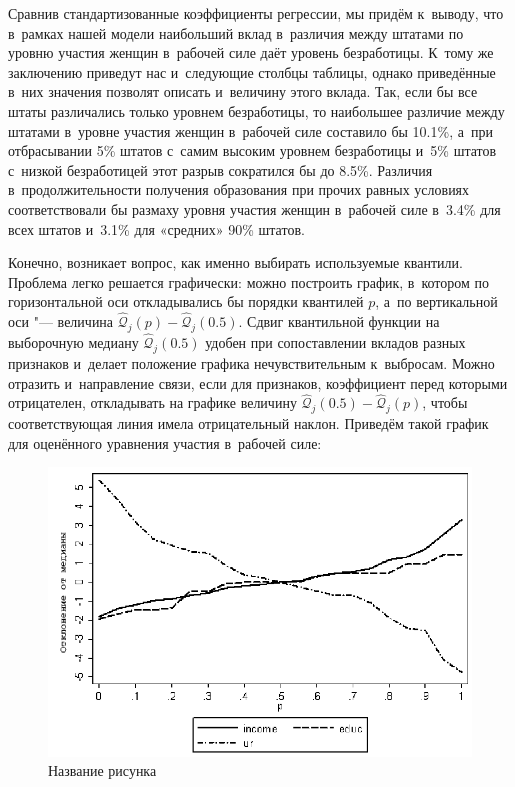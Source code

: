 \documentclass[11pt]{article}
\begin{document}
Сравнив стандартизованные коэффициенты регрессии, мы придём к~выводу, что в~рамках нашей модели наибольший вклад в~различия между штатами по уровню участия женщин в~рабочей силе даёт уровень безработицы. К~тому же заключению приведут нас и~следующие столбцы таблицы, однако приведённые в~них значения позволят описать и~величину этого вклада. Так, если бы все штаты различались только уровнем безработицы, то наибольшее различие между штатами в~уровне участия женщин в~рабочей силе составило бы 10.1\%, а~при отбрасывании 5\% штатов с~самим высоким уровнем безработицы и~5\% штатов с~низкой безработицей этот разрыв сократился бы до 8.5\%. Различия в~продолжительности получения образования при прочих равных условиях соответствовали бы размаху уровня участия женщин в~рабочей силе в~3.4\% для всех штатов и~3.1\% для «средних» 90\% штатов.

Конечно, возникает вопрос, как именно выбирать используемые квантили. Проблема легко решается графически: можно построить график, в~котором по горизонтальной оси откладывались бы порядки квантилей $p$, а~по вертикальной оси "--- величина $\hat{\mathcal{Q}}_j(p) - \hat{\mathcal{Q}}_j(0.5)$. Сдвиг квантильной функции на выборочную медиану $\hat{\mathcal{Q}}_j(0.5)$ удобен при сопоставлении вкладов разных признаков и~делает положение графика нечувствительным к~выбросам. Можно отразить и~направление связи, если для признаков, коэффициент перед которыми отрицателен, откладывать на графике величину $\hat{\mathcal{Q}}_j(0.5) - \hat{\mathcal{Q}}_j(p)$, чтобы соответствующая линия имела отрицательный наклон. Приведём такой график для оценённого уравнения участия в~рабочей силе:


\begin{figure}[htbp]
	\centering
	\includegraphics[width=12cm]{femalelabor.png}
	\caption{Название рисунка}\label{fig:femalelabor}
\end{figure}
\end{document}
